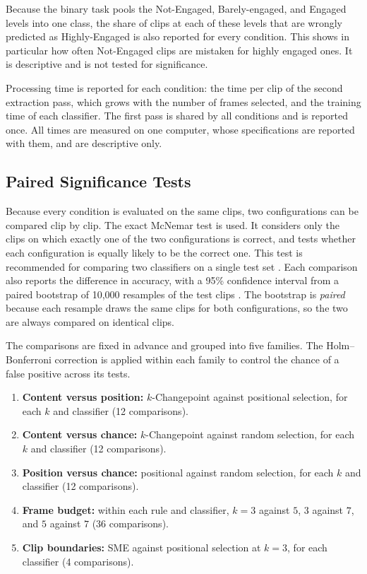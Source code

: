 Because the binary task pools the Not-Engaged, Barely-engaged, and Engaged levels into one class, the share of clips at each of these levels that are wrongly predicted as Highly-Engaged is also reported for every condition. This shows in particular how often Not-Engaged clips are mistaken for highly engaged ones. It is descriptive and is not tested for significance.

Processing time is reported for each condition: the time per clip of the second extraction pass, which grows with the number of frames selected, and the training time of each classifier. The first pass is shared by all conditions and is reported once. All times are measured on one computer, whose specifications are reported with them, and are descriptive only.

\subsection{Paired Significance Tests}

Because every condition is evaluated on the same clips, two configurations can be compared clip by clip. The exact McNemar test \cite{mcnemar1947} is used. It considers only the clips on which exactly one of the two configurations is correct, and tests whether each configuration is equally likely to be the correct one. This test is recommended for comparing two classifiers on a single test set \cite{dietterich1998}. Each comparison also reports the difference in accuracy, with a 95\% confidence interval from a paired bootstrap of 10,000 resamples of the test clips \cite{efron1993}. The bootstrap is \emph{paired} because each resample draws the same clips for both configurations, so the two are always compared on identical clips.

The comparisons are fixed in advance and grouped into five families. The Holm--Bonferroni correction \cite{holm1979} is applied within each family to control the chance of a false positive across its tests.

\begin{enumerate}
   \item \textbf{Content versus position:} $k$-Changepoint against positional selection, for each $k$ and classifier (12 comparisons).
   \item \textbf{Content versus chance:} $k$-Changepoint against random selection, for each $k$ and classifier (12 comparisons).
   \item \textbf{Position versus chance:} positional against random selection, for each $k$ and classifier (12 comparisons).
   \item \textbf{Frame budget:} within each rule and classifier, $k = 3$ against $5$, $3$ against $7$, and $5$ against $7$ (36 comparisons).
   \item \textbf{Clip boundaries:} SME against positional selection at $k = 3$, for each classifier (4 comparisons).
\end{enumerate}

